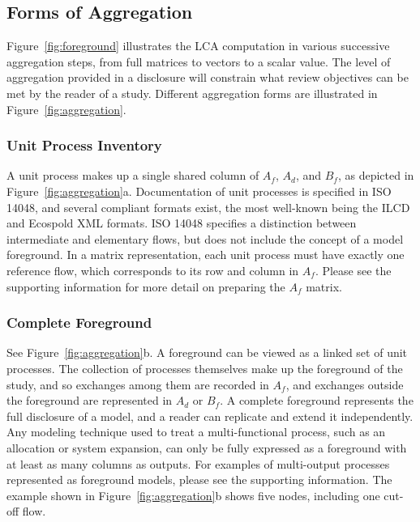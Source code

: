 \subsection{Forms of Aggregation}

Figure~\ref{fig:foreground} illustrates the LCA computation in various successive aggregation steps, from full matrices to vectors to a scalar value.  The level of aggregation provided in a disclosure will constrain what review objectives can be met by the reader of a study.  Different aggregation forms are illustrated in Figure~\ref{fig:aggregation}.

\subsubsection{Unit Process Inventory}

A unit process makes up a single shared column of $A_f$, $A_d$, and $B_f$, as depicted in Figure~\ref{fig:aggregation}a.  Documentation of unit processes is specified in ISO 14048, and several compliant formats exist, the most well-known being the ILCD and Ecospold XML formats.  ISO 14048 specifies a distinction between intermediate and elementary flows, but does not include the concept of a model foreground.  In a matrix representation, each unit process must have exactly one reference flow, which corresponds to its row and column in $A_f$.
Please see the supporting information for more detail on preparing the $A_f$ matrix.



\subsubsection{Complete Foreground}

See Figure~\ref{fig:aggregation}b.  A foreground can be viewed as a linked set of unit processes.  The collection of processes themselves make up the foreground of the study, and so exchanges among them are recorded in $A_f$, and exchanges outside the foreground are represented in $A_d$ or $B_f$.  A complete foreground represents
the full disclosure of a model, and a reader can replicate and extend it independently.
Any modeling technique used to treat a multi-functional process, such as an allocation or system expansion, can only be fully expressed as a foreground with at least as many columns as outputs.  For examples of multi-output processes represented as foreground models, please see the supporting information.  The example shown in Figure~\ref{fig:aggregation}b shows five nodes, including one cut-off flow.

